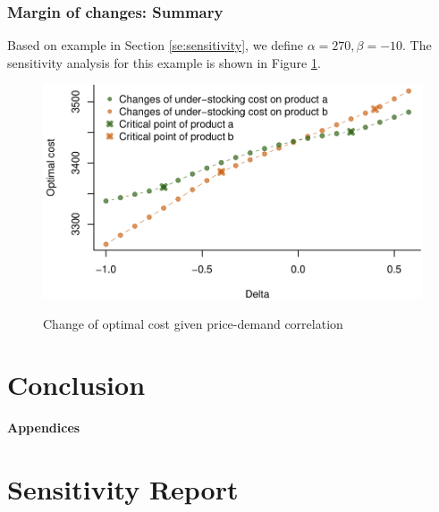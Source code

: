 \documentclass[a4paper,11pt]{article}
\begin{document}
\subsubsection{Margin of changes: Summary}
Based on example in Section \ref{se:sensitivity}, we define $\alpha = 270, \beta = -10$. The sensitivity analysis for this example is shown in Figure \ref{fig:demandunder}.

\begin{figure}[ht]
\centering
\caption{Change of optimal cost given price-demand correlation}
\includegraphics{Example-figure_files/figure-latex/demandunder-1.pdf}
\label{fig:demandunder}
\end{figure}

\section{Conclusion}

\printbibliography
\newpage
\begin{center}
{\bf\Large Appendices}
\end{center}

\appendix
\section{Sensitivity Report}
\label{se:report}
\end{document}
